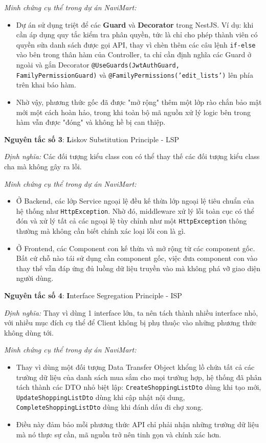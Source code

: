 \documentclass[../main.tex]{subfiles}
\begin{document}
\textit{Minh chứng cụ thể trong dự án NaviMart:}
\begin{itemize}
    \item Dự án sử dụng triệt để các \textbf{Guard} và \textbf{Decorator} trong NestJS. Ví dụ: khi cần áp dụng quy tắc kiểm tra phân quyền, tức là chỉ cho phép thành viên có quyền sửa danh sách được gọi API, thay vì chèn thêm các câu lệnh \texttt{if-else} vào bên trong thân hàm của Controller, ta chỉ cần định nghĩa các Guard ở ngoài và gắn Decorator \texttt{@UseGuards(JwtAuthGuard, FamilyPermissionGuard)} và \texttt{@FamilyPermissions('edit\_lists')} lên phía trên khai báo hàm.
    \item Nhờ vậy, phương thức gốc đã được "mở rộng" thêm một lớp rào chắn bảo mật mới một cách hoàn hảo, trong khi toàn bộ mã nguồn xử lý logic bên trong hàm vẫn được "đóng" và không hề bị can thiệp.
\end{itemize}

\textbf{Nguyên tắc số 3}: \textbf{L}iskov Substitution Principle - LSP

\textit{Định nghĩa:} Các đối tượng kiểu class con có thể thay thế các đối tượng kiểu class cha mà không gây ra lỗi.

\textit{Minh chứng cụ thể trong dự án NaviMart:}
\begin{itemize}
    \item Ở Backend, các lớp Service ngoại lệ đều kế thừa lớp ngoại lệ tiêu chuẩn của hệ thống như \texttt{HttpException}. Nhờ đó, middleware xử lý lỗi toàn cục có thể đón và xử lý tất cả các ngoại lệ tùy chỉnh như một \texttt{HttpException} thông thường mà không cần biết chính xác loại lỗi con là gì.
    \item Ở Frontend, các Component con kế thừa và mở rộng từ các component gốc. Bất cứ chỗ nào tái sử dụng cần component gốc, việc đưa component con vào thay thế vẫn đáp ứng đủ luồng dữ liệu truyền vào mà không phá vỡ giao diện người dùng.
\end{itemize}

\textbf{Nguyên tắc số 4}: \textbf{I}nterface Segregation Principle - ISP

\textit{Định nghĩa:} Thay vì dùng 1 interface lớn, ta nên tách thành nhiều interface nhỏ, với nhiều mục đích cụ thể để Client không bị phụ thuộc vào những phương thức không dùng tới.

\textit{Minh chứng cụ thể trong dự án NaviMart:}
\begin{itemize}
    \item Thay vì dùng một đối tượng Data Transfer Object khổng lồ chứa tất cả các trường dữ liệu của danh sách mua sắm cho mọi trường hợp, hệ thống đã phân tách thành các DTO nhỏ biệt lập: \texttt{CreateShoppingListDto} dùng khi tạo mới, \texttt{UpdateShoppingListDto} dùng khi cập nhật nội dung, \texttt{CompleteShoppingListDto} dùng khi đánh dấu đi chợ xong.
    \item Điều này đảm bảo mỗi phương thức API chỉ phải nhận những trường dữ liệu mà nó thực sự cần, mã nguồn trở nên tinh gọn và chính xác hơn.
\end{itemize}
\end{document}
